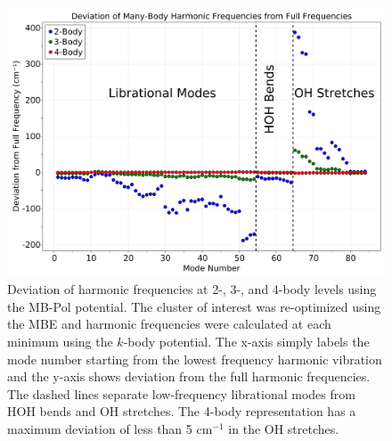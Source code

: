 \begin{figure}[t]
\uwsinglespace
\begin{center}
\begin{minipage}{0.8\textwidth}
\includegraphics[width=\textwidth]{Figures/Chapter_4/ch4_figure_7.png}
\end{minipage}
\end{center}
\begin{spacing}{1.0}
\caption[Deviation of harmonic frequencies at 2-, 3-, and 4-body levels using the MB-Pol potential. The  cluster of interest was re-optimized using the MBE and harmonic frequencies were calculated at each minimum using the $k$-body potential.]{Deviation of harmonic frequencies at 2-, 3-, and 4-body levels using the MB-Pol potential. The  cluster of interest was re-optimized using the MBE and harmonic frequencies were calculated at each minimum using the $k$-body potential. The x-axis simply labels the mode number starting from the lowest frequency harmonic vibration and the y-axis shows deviation from the full harmonic frequencies. The dashed lines separate low-frequency librational modes from HOH bends and OH stretches. The 4-body representation has a maximum deviation of less than 5 $\mathrm{cm}^{-1}$ in the OH stretches.}\label{fig:MBE_MD_F7}
\end{spacing}
\end{figure}